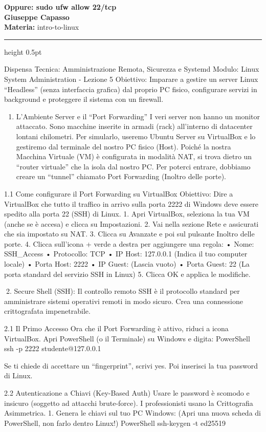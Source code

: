 \documentclass[11pt,a4paper]{article}
\providecommand{\tightlist}{%
  \setlength{\itemsep}{0pt}\setlength{\parskip}{0pt}}
\newcommand{\proposaltitle}[1]{
    \begin{center}
        \vspace*{0.1cm}
        {\LARGE \bfseries \color{blue} #1} \\[1.5ex]
        {\large \textbf{Giuseppe Capasso}} \\[1ex]
                \small{
            \vspace{0.1cm}
            \textbf{Materia:} intro-to-linux\\
        }
            \end{center}
    \vspace{0.3cm}
    \hrule height 0.5pt
    \vspace{0.5cm}
}
\begin{document}
\proposaltitle{Oppure: sudo ufw allow 22/tcp}

Dispensa Tecnica: Amministrazione Remota, Sicurezza e Systemd Modulo:
Linux System Administration - Lezione 5 Obiettivo: Imparare a gestire un
server Linux ``Headless'' (senza interfaccia grafica) dal proprio PC
fisico, configurare servizi in background e proteggere il sistema con un
firewall.

\begin{enumerate}
\def\labelenumi{\arabic{enumi}.}
\tightlist
\item
  L'Ambiente Server e il ``Port Forwarding'' I veri server non hanno un
  monitor attaccato. Sono macchine inserite in armadi (rack) all'interno
  di datacenter lontani chilometri. Per simularlo, useremo Ubuntu Server
  su VirtualBox e lo gestiremo dal terminale del nostro PC fisico
  (Host). Poiché la nostra Macchina Virtuale (VM) è configurata in
  modalità NAT, si trova dietro un ``router virtuale'' che la isola dal
  nostro PC. Per poterci entrare, dobbiamo creare un ``tunnel'' chiamato
  Port Forwarding (Inoltro delle porte).
\end{enumerate}

1.1 Come configurare il Port Forwarding su VirtualBox Obiettivo: Dire a
VirtualBox che tutto il traffico in arrivo sulla porta 2222 di Windows
deve essere spedito alla porta 22 (SSH) di Linux. 1. Apri VirtualBox,
seleziona la tua VM (anche se è accesa) e clicca su Impostazioni. 2. Vai
nella sezione Rete e assicurati che sia impostato su NAT. 3. Clicca su
Avanzate e poi sul pulsante Inoltro delle porte. 4. Clicca sull'icona +
verde a destra per aggiungere una regola: • Nome: SSH\_Access •
Protocollo: TCP • IP Host: 127.0.0.1 (Indica il tuo computer locale) •
Porta Host: 2222 • IP Guest: (Lascia vuoto) • Porta Guest: 22 (La porta
standard del servizio SSH in Linux) 5. Clicca OK e applica le modifiche.

2. Secure Shell (SSH): Il controllo remoto SSH è il protocollo standard
per amministrare sistemi operativi remoti in modo sicuro. Crea una
connessione crittografata impenetrabile.

2.1 Il Primo Accesso Ora che il Port Forwarding è attivo, riduci a icona
VirtualBox. Apri PowerShell (o il Terminale) su Windows e digita:
PowerShell ssh -p 2222 studente@127.0.0.1

Se ti chiede di accettare un ``fingerprint'', scrivi yes. Poi inserisci
la tua password di Linux.

2.2 Autenticazione a Chiavi (Key-Based Auth) Usare le password è scomodo
e insicuro (soggetto ad attacchi brute-force). I professionisti usano la
Crittografia Asimmetrica. 1. Genera le chiavi sul tuo PC Windows: (Apri
una nuova scheda di PowerShell, non farlo dentro Linux!) PowerShell
ssh-keygen -t ed25519
\end{document}

